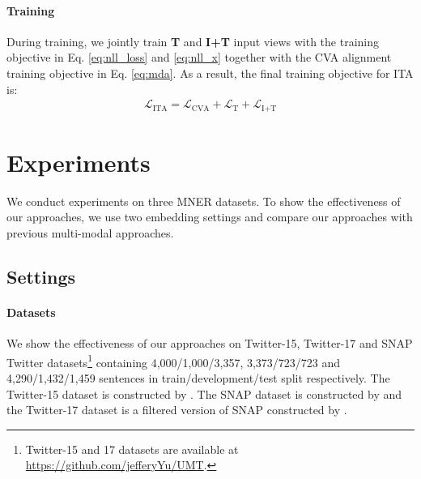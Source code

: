 \documentclass[11pt]{article}
\newcommand{\mcL}{\mathcal{L}}
\begin{document}
\paragraph{Training} During training, we jointly train \textbf{T} and \textbf{I+T} input views with the training objective in Eq. \ref{eq:nll_loss} and \ref{eq:nll_x} together with the CVA alignment training objective in Eq. \ref{eq:mda}. As a result, the final training objective for ITA is:
\begin{align}
\mcL_{\text{ITA}} = \mcL_{\text{CVA}} + \mcL_{\text{T}} + \mcL_{\text{I+T}} \nonumber
\end{align}









\section{Experiments}
\label{sec:exp}
We conduct experiments on three MNER datasets. To show the effectiveness of our approaches, we use two embedding settings and compare our approaches with previous multi-modal approaches.
\subsection{Settings}

\paragraph{Datasets}
We show the effectiveness of our approaches on Twitter-15, Twitter-17 and SNAP Twitter datasets\footnote{Twitter-15 and 17 datasets are available at \url{https://github.com/jefferyYu/UMT}.} containing 4,000/1,000/3,357, 3,373/723/723 and 4,290/1,432/1,459 sentences in train/development/test split respectively. The Twitter-15 dataset is constructed by \citet{zhang2018adaptive}. The SNAP dataset is constructed by \citet{lu-etal-2018-visual} and the Twitter-17 dataset is a filtered version of SNAP constructed by \citet{yu-etal-2020-improving-multimodal}.
\end{document}
